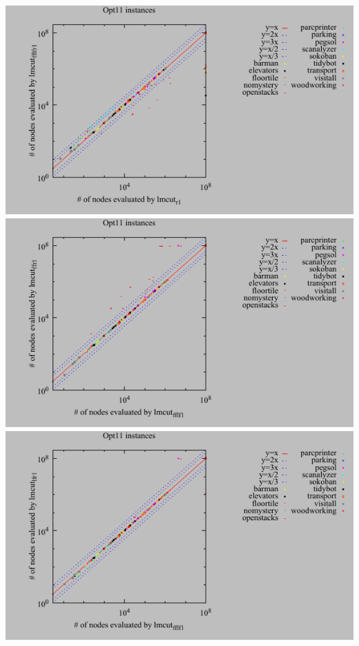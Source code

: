 \includegraphics{tables/opt11-evaluated-lmcut_r-lmcut_fflfr.pdf}
\linebreak
\includegraphics{tables/opt11-evaluated-lmcut_fflf-lmcut_ffr.pdf}
\linebreak
\includegraphics{tables/opt11-evaluated-lmcut_fflf-lmcut_lfr.pdf}
\linebreak

